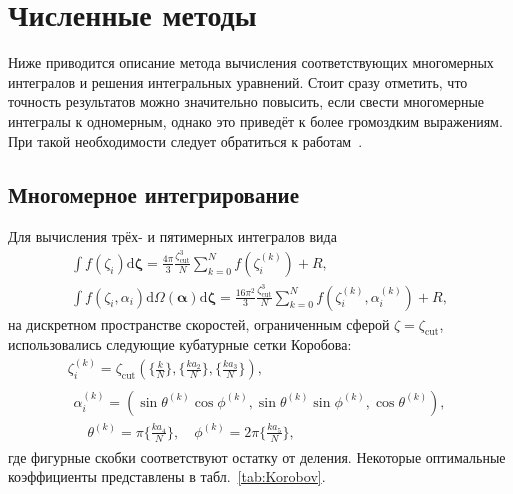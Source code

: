 \documentclass[a4paper,12pt]{article}
\newcommand{\dd}{\mathrm{d}}
\begin{document}
\section{Численные методы}

Ниже приводится описание метода вычисления соответствующих многомерных интегралов
и решения интегральных уравнений.
Стоит сразу отметить, что точность результатов можно значительно повысить,
если свести многомерные интегралы к одномерным,
однако это приведёт к более громоздким выражениям.
При такой необходимости следует обратиться к работам~\cite{Pekeris1957, Ohwada1992}.

\subsection{Многомерное интегрирование}\label{sec:Korobov}

Для вычисления трёх- и пятимерных интегралов вида
\begin{gather}
    \int f(\zeta_i) \boldsymbol{\dd\zeta} = \frac{4\pi}{3}\frac{\zeta_\mathrm{cut}^3}{N}
        \sum_{k=0}^N f(\zeta_i^{(k)}) + R, \label{eq:dicrete_L}\\
    \int f(\zeta_i,\alpha_i) \dd\Omega(\boldsymbol{\alpha})\boldsymbol{\dd\zeta} = \frac{16\pi^2}{3}\frac{\zeta_\mathrm{cut}^3}{N}
        \sum_{k=0}^N f(\zeta_i^{(k)},\alpha_i^{(k)}) + R, \label{eq:dicrete_J}
\end{gather}
на дискретном пространстве скоростей, ограниченным сферой \(\zeta = \zeta_\mathrm{cut}\),
использовались следующие кубатурные сетки Коробова:
\begin{gather}
    \zeta_i^{(k)} = \zeta_\mathrm{cut}\left( \Big\{\frac{k}{N}\Big\}, \Big\{\frac{k a_2}{N}\Big\}, \Big\{\frac{k a_3}N\Big\} \right), \\
    \begin{split}
    \alpha_i^{(k)} = \left( \sin\theta^{(k)}\cos\phi^{(k)}, \sin\theta^{(k)}\sin\phi^{(k)}, \cos\theta^{(k)} \right), \\
    \quad \theta^{(k)} =  \pi\Big\{\frac{k a_4}{N}\Big\},
    \quad \phi^{(k)}   = 2\pi\Big\{\frac{k a_5}{N}\Big\},
    \end{split}
\end{gather}
где фигурные скобки соответствуют остатку от деления.
Некоторые оптимальные коэффициенты представлены в табл.~\ref{tab:Korobov}.
\end{document}
